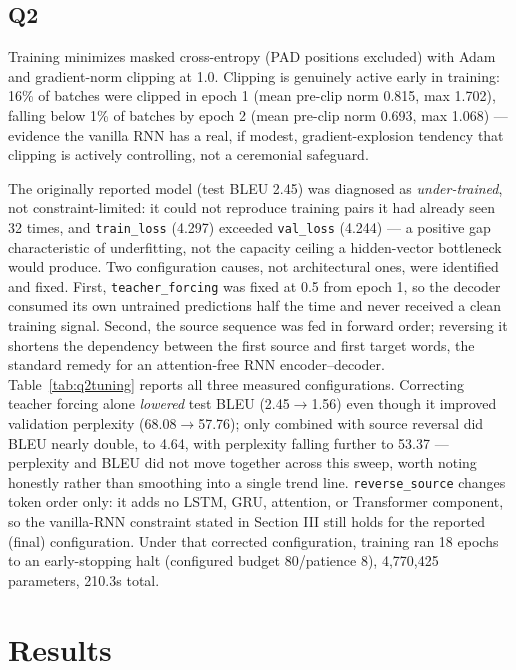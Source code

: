 \documentclass[conference]{IEEEtran}
\begin{document}
\subsection{Q2}
Training minimizes masked cross-entropy (PAD positions excluded) with
Adam and gradient-norm clipping at 1.0. Clipping is genuinely active
early in training: 16\% of batches were clipped in epoch 1 (mean
pre-clip norm 0.815, max 1.702), falling below 1\% of batches by epoch
2 (mean pre-clip norm 0.693, max 1.068) --- evidence the vanilla RNN
has a real, if modest, gradient-explosion tendency that clipping is
actively controlling, not a ceremonial safeguard.

The originally reported model (test BLEU 2.45) was diagnosed as
\emph{under-trained}, not constraint-limited: it could not reproduce
training pairs it had already seen 32 times, and \texttt{train\_loss}
(4.297) exceeded \texttt{val\_loss} (4.244) --- a positive gap
characteristic of underfitting, not the capacity ceiling a hidden-vector
bottleneck would produce. Two configuration causes, not architectural
ones, were identified and fixed. First, \texttt{teacher\_forcing} was
fixed at 0.5 from epoch 1, so the decoder consumed its own untrained
predictions half the time and never received a clean training signal.
Second, the source sequence was fed in forward order; reversing it
\cite{sutskever2014seq2seq} shortens the dependency between the first
source and first target words, the standard remedy for an
attention-free RNN encoder--decoder. Table~\ref{tab:q2tuning} reports
all three measured configurations. Correcting teacher forcing alone
\emph{lowered} test BLEU (2.45$\to$1.56) even though it improved
validation perplexity (68.08$\to$57.76); only combined with source
reversal did BLEU nearly double, to 4.64, with perplexity falling
further to 53.37 --- perplexity and BLEU did not move together across
this sweep, worth noting honestly rather than smoothing into a single
trend line. \texttt{reverse\_source} changes token order only: it adds
no LSTM, GRU, attention, or Transformer component, so the vanilla-RNN
constraint stated in Section III still holds for the reported (final)
configuration. Under that corrected configuration, training ran 18
epochs to an early-stopping halt (configured budget 80/patience 8),
4,770,425 parameters, 210.3s total.



\section{Results}
\end{document}
